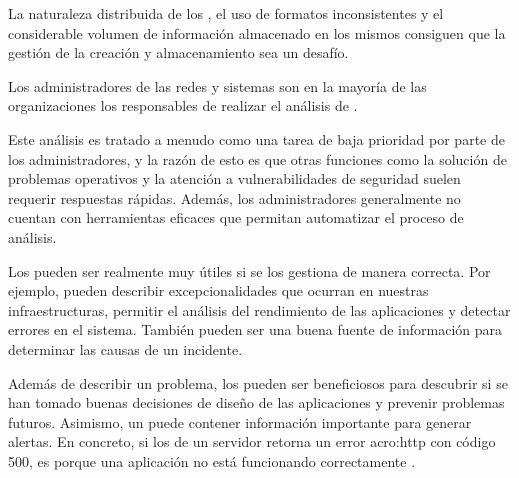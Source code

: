 La naturaleza distribuida de los , el uso de formatos inconsistentes
y el considerable volumen de información almacenado en los mismos consiguen que
la gestión de la creación y almacenamiento sea un desafío.

Los administradores de las redes y sistemas son en la mayoría de las
organizaciones los responsables de realizar el análisis de .

Este análisis es tratado a menudo como una tarea de baja prioridad por parte de
los administradores, y la razón de esto es que otras funciones como la solución
de problemas operativos y la atención a vulnerabilidades de seguridad suelen
requerir respuestas rápidas. Además, los administradores generalmente no
cuentan con herramientas eficaces que permitan automatizar el proceso de
análisis.

Los  pueden ser realmente muy útiles si se los gestiona de manera
correcta. Por ejemplo, pueden describir excepcionalidades que ocurran en
nuestras infraestructuras, permitir el análisis del rendimiento de las
aplicaciones y detectar errores en el sistema. También pueden ser una buena
fuente de información para determinar las causas de un incidente.

Además de describir un problema, los  pueden ser beneficiosos para
descubrir si se han tomado buenas decisiones de diseño de las aplicaciones y
prevenir problemas futuros. Asimismo, un  puede contener información
importante para generar alertas. En concreto, si los  de un servidor
 retorna un error \gls{acro:http} con código 500, es porque una
aplicación no está funcionando correctamente
\cite[p.~30-31]{monitoreo:logging_and_log_management}.
